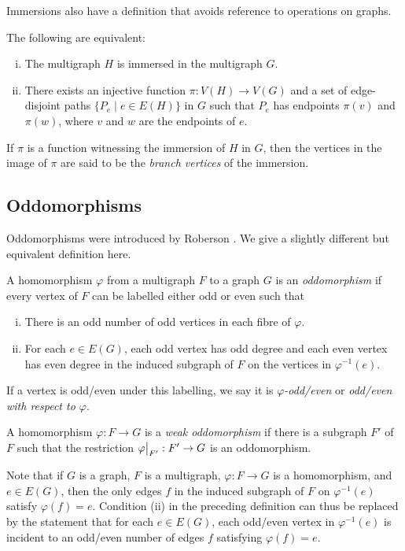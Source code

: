 \documentclass[11pt]{article}
\begin{document}
Immersions also have a definition that avoids reference to operations on graphs.
\begin{proposition}
    The following are equivalent:
    \begin{enumerate}[(i)]
        \item The multigraph $H$ is immersed in the multigraph $G$.
        \item There exists an injective function $\pi:V(H) \to V(G)$ and a set of edge-disjoint paths $\{P_e \mid e \in E(H)\}$ in $G$ such that $P_e$ has endpoints $\pi(v)$ and $\pi(w)$, where $v$ and $w$ are the endpoints of $e$.
    \end{enumerate}
\end{proposition}
If $\pi$ is a function witnessing the immersion of $H$ in $G$, then the vertices in the image of $\pi$ are said to be the \emph{branch vertices} of the immersion.

\subsection{Oddomorphisms}
Oddomorphisms were introduced by Roberson \cite{roberson2022oddomorphisms}. We give a slightly different but equivalent definition here.
\begin{definition}
\label{def:oddomorphisms}
    A homomorphism $\varphi$ from a multigraph $F$ to a graph $G$ is an \emph{oddomorphism} if every vertex of $F$ can be labelled either odd or even such that 
    \begin{enumerate}[(i)]
        \item There is an odd number of odd vertices in each fibre of $\varphi$.
        \item For each $e \in E(G)$, each odd vertex has odd degree and each even vertex has even degree in the induced subgraph of $F$ on the vertices in $\varphi^{-1}(e)$.
    \end{enumerate}
    If a vertex is odd/even under this labelling, we say it is \emph{$\varphi$-odd/even} or \emph{odd/even with respect to $\varphi$}.\par 
    A homomorphism $\varphi: F \to G$ is a \emph{weak oddomorphism} if there is a subgraph $F'$ of $F$ such that the restriction $\restr{\varphi}{F'}: F' \to G$ is an oddomorphism.
\end{definition}
Note that if $G$ is a graph, $F$ is a multigraph, $\varphi: F \to G$ is a homomorphism, and $e \in E(G)$, then the only edges $f$ in the induced subgraph of $F$ on $\varphi^{-1}(e)$ satisfy $\varphi(f) = e$. Condition (ii) in the preceding definition can thus be replaced by the statement that for each $e \in E(G)$, each odd/even vertex in $\varphi^{-1}(e)$ is incident to an odd/even number of edges $f$ satisfying $\varphi(f) = e$.
\end{document}
